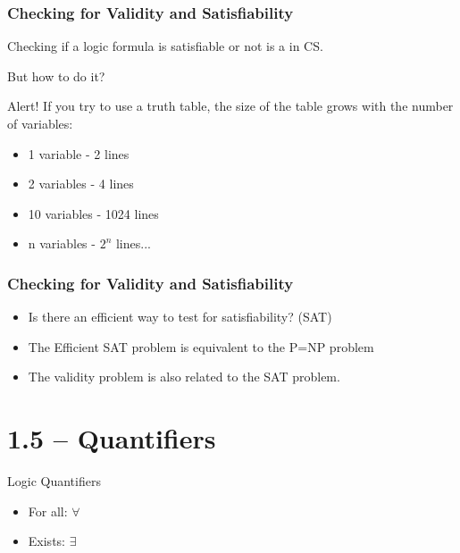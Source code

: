 \documentclass{beamer}
\begin{document}
\begin{frame}
  \frametitle{Checking for Validity and Satisfiability}

  Checking if a logic formula is satisfiable or not is a
   in CS.

  \bigskip

  But how to do it?

  \bigskip

  \alert{Alert!} If you try to use a truth table, the size of the
  table grows with the number of variables:
  \begin{itemize}
  \item 1 variable - 2 lines
  \item 2 variables - 4 lines
  \item 10 variables - 1024 lines
  \item n variables - $2^n$ lines...
  \end{itemize}  
\end{frame}

\begin{frame}
  \frametitle{Checking for Validity and Satisfiability}
  \begin{itemize}
  \item Is there an efficient way to test for satisfiability? (SAT)
    \bigskip
    
  \item The Efficient SAT problem is equivalent to the P=NP problem
    \bigskip
    
  \item The validity problem is also related to the SAT problem.
  \end{itemize}
\end{frame}

\section{1.5 -- Quantifiers}
\begin{frame}
  \begin{center}
    Logic Quantifiers
  \end{center}

  \bigskip
  \begin{itemize}
  \item For all: $\forall$
  \item Exists: $\exists$
  \end{itemize}
\end{frame}
\end{document}
